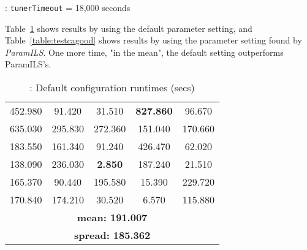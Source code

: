 \begin{table}[h]
\centering 
\renewcommand{\arraystretch}{1.2}
\caption{\CARRP{}: \texttt{tunerTimeout} = 18,000 seconds}\label{table:ca1}
\end{table}

Table~\ref{table:testcabad} shows results by using the default parameter setting, and Table~\ref{table:testcagood} shows results by using the parameter setting found by {\it ParamILS}. One more time, "in the mean", the default setting outperforms {\sc ParamILS}'s.

\begin{table}[h]
\centering
\renewcommand{\arraystretch}{1.2}
\begin{tabular}{|ccccc|}
	\hline
	452.980 & 91.420 & 31.510 & \textcolor{intenso}{\bf 827.860} & 96.670 \\ 
	635.030 & 295.830 & 272.360 & 151.040 & 170.660 \\  
	\hline 
	183.550 & 161.340 & 91.240 & 426.470 & 62.020 \\ 
	138.090 & 236.030 & \textcolor{naranja}{\bf 2.850} & 187.240 & 21.510 \\  
	\hline 
	165.370 & 90.440 & 195.580 & 15.390 & 229.720 \\ 
	170.840 & 174.210 & 30.520 & 6.570 & 115.880 \\  
	\hline
	\multicolumn{5}{|c|}{\bf mean: 191.007}\\
	\multicolumn{5}{|c|}{\bf spread: 185.362}\\
	\hline
\end{tabular}
\caption{\CARRP: Default configuration runtimes (secs)}\label{table:testcabad}
\end{table}

